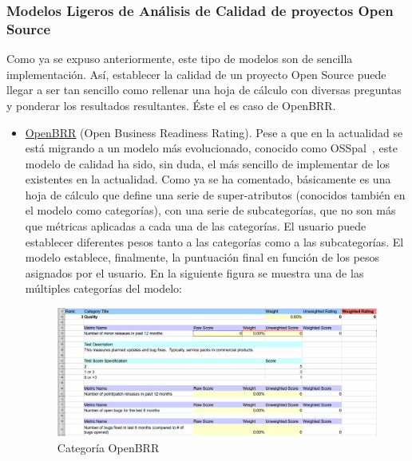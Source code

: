 \documentclass[11pt]{article}
\begin{document}
\subsubsection{Modelos Ligeros de Análisis de Calidad de proyectos Open Source}

Como ya se expuso anteriormente, este tipo de modelos son de sencilla implementación. Así, establecer la calidad de un proyecto Open Source puede llegar a ser tan sencillo como rellenar una hoja de cálculo con diversas preguntas y ponderar los resultados resultantes. Éste el es caso de OpenBRR.

\begin{itemize}
\item{\underline{OpenBRR}} (Open Business Readiness Rating). Pese a que en la actualidad se está migrando a un modelo más evolucionado, conocido como OSSpal~\cite{osspal:osspal}, este modelo de calidad ha sido, sin duda, el más sencillo de implementar de los existentes en la actualidad. Como ya se ha comentado, básicamente es una hoja de cálculo que define una serie de super-atributos (conocidos también en el modelo como categorías), con una serie de subcategorías, que no son más que métricas aplicadas a cada una de las categorías. El usuario puede establecer diferentes pesos tanto a las categorías como a las subcategorías. El modelo establece, finalmente, la puntuación final en función de los pesos asignados por el usuario. En la siguiente figura se muestra una de las múltiples categorías del modelo:

\begin{center}
 \begin{figure}[H]
 \begin{center}
   \includegraphics[width=16cm]{img/openbrr_extract00.png}
   \caption{Categoría OpenBRR}
   \label{fig:openbrrcategory}
 \end{center}
 \end{figure}
\end{center}


\end{itemize}
\end{document}
